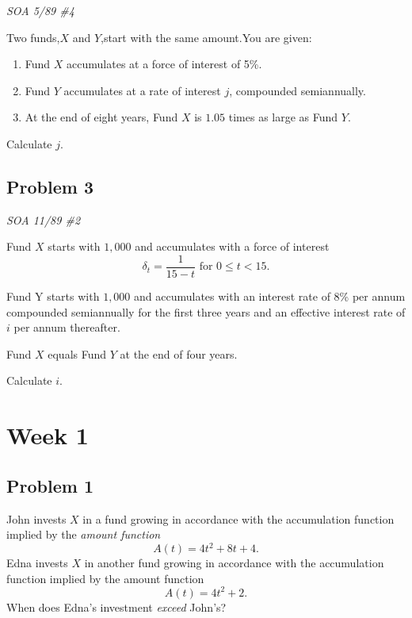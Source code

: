 \documentclass[
]{book}
\begin{document}
\emph{SOA 5/89 \#4}

Two funds,\(X\) and \(Y\),start with the same amount.You are given:

\begin{enumerate}
\def\labelenumi{\arabic{enumi}.}
\item
  Fund \(X\) accumulates at a force of interest of 5\%.
\item
  Fund \(Y\) accumulates at a rate of interest \(j\), compounded semiannually.
\item
  At the end of eight years, Fund \(X\) is \(1.05\) times as large as Fund \(Y\).
\end{enumerate}

Calculate \(j\).

\hypertarget{problem-3}{%
\subsection*{Problem 3}\label{problem-3}}

\emph{SOA 11/89 \#2}

Fund \(X\) starts with \(1,000\) and accumulates with a force of interest \[\delta_{t}=\frac{1}{15-t} \text{ for } 0 \le t< 15.\]

Fund Y starts with \(1,000\) and accumulates with an interest rate of 8\% per annum compounded semiannually for the first three years and an effective interest rate of \(i\) per annum thereafter.

Fund \(X\) equals Fund \(Y\) at the end of four years.

Calculate \(i\).

\hypertarget{week-1}{%
\section*{Week 1}\label{week-1}}

\hypertarget{problem-1-1}{%
\subsection*{Problem 1}\label{problem-1-1}}

John invests \(X\) in a fund growing in accordance with the accumulation function implied by the \emph{amount function}
\[A(t)=4t^2+8t+4.\]
Edna invests \(X\) in another fund growing in accordance with the accumulation function implied by the amount function \[A(t)=4t^2+2.\]
When does Edna's investment \emph{exceed} John's?
\end{document}
